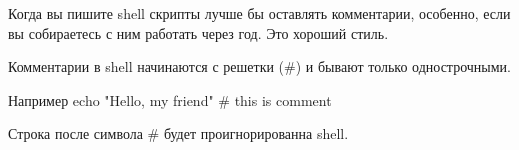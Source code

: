 Когда вы пишите shell  скрипты лучше бы оставлять комментарии, особенно, если вы собираетесь с ним работать через год. Это хороший стиль. 

Комментарии в shell начинаются с решетки (\#) и бывают только однострочными.

\begin{shCode}{Например}
	echo "Hello, my friend" # this is comment \end{shCode}

Строка после символа \# будет проигнорированна shell.